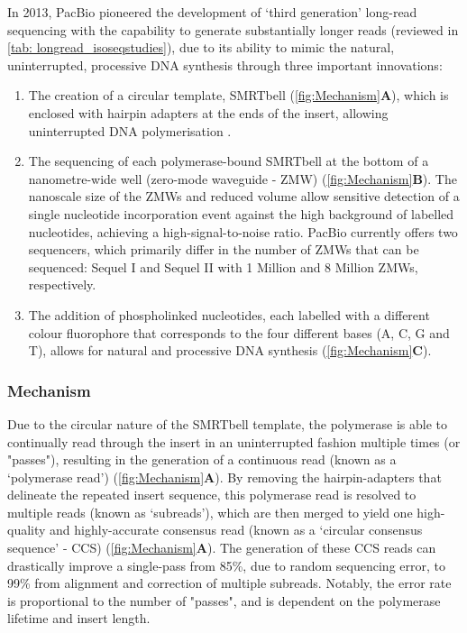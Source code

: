 In 2013, PacBio pioneered the development of ‘third generation' long-read sequencing with the capability to generate substantially longer reads (reviewed in \cref{tab: longread_isoseqstudies}), due to its ability to mimic the natural, uninterrupted, processive DNA synthesis through three important innovations\cite{Eid2009}: 
\begin{enumerate}
	\item The creation of a circular template, SMRTbell (\cref{fig:Mechanism}\textbf{A}), which is enclosed with hairpin adapters at the ends of the insert, allowing uninterrupted DNA polymerisation \cite{Travers2010}.
	\item The sequencing of each polymerase-bound SMRTbell at the bottom of a nanometre-wide well (zero-mode waveguide - ZMW)\cite{Levene2003} (\cref{fig:Mechanism}\textbf{B}). The nanoscale size of the ZMWs and reduced volume allow sensitive detection of a single nucleotide incorporation event against the high background of labelled nucleotides, achieving a high-signal-to-noise ratio. PacBio currently offers two sequencers, which primarily differ in the number of ZMWs that can be sequenced: Sequel I and Sequel II with 1 Million and 8 Million ZMWs, respectively.   
	\item The addition of phospholinked nucleotides, each labelled with a different colour fluorophore that corresponds to the four different bases (A, C, G and T), allows for natural and processive DNA synthesis\cite{Mccarthy2010} (\cref{fig:Mechanism}\textbf{C}). 
\end{enumerate}

\subsubsection{Mechanism}
Due to the circular nature of the SMRTbell template, the polymerase is able to continually read through the insert in an uninterrupted fashion multiple times (or "passes"), resulting in the generation of a continuous read (known as a ‘polymerase read') (\cref{fig:Mechanism}\textbf{A}). By removing the hairpin-adapters that delineate the repeated insert sequence, this polymerase read is resolved to multiple reads (known as ‘subreads'), which are then merged to yield one high-quality and highly-accurate consensus read (known as a ‘circular consensus sequence' - CCS) (\cref{fig:Mechanism}\textbf{A}). The generation of these CCS reads can drastically improve a single-pass from 85\%, due to random sequencing error, to 99\% from alignment and correction of multiple subreads. Notably, the error rate is proportional to the number of "passes", and is dependent on the polymerase lifetime and insert length\cite{Travers2010}. 


